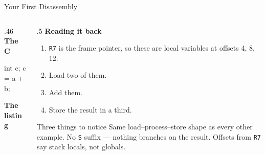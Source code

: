 \documentclass[9pt,aspectratio=169,xcolor=table]{beamer}
\begin{document}
\begin{frame}[fragile]{Your First Disassembly}
    \begin{columns}[T]
    \begin{column}{.46\textwidth}
        \textbf{The C}

        \vspace{1mm}
        \begin{cc}
	int c;
	c = a + b;
\end{cc}

        \vspace{3mm}
        \textbf{The listing}

        \vspace{1mm}
    \end{column}
    \begin{column}{.5\textwidth}
        \textbf{Reading it back}

        \vspace{1mm}
        {\small
        \begin{enumerate}\itemsep1pt
            \item \texttt{R7} is the \alert{frame pointer}, so these are
                  \alert{local variables} at offsets 4, 8, 12.
            \item Load two of them.
            \item Add them.
            \item Store the result in a third.
        \end{enumerate}}

        \vspace{3mm}
        \begin{block}{Three things to notice}
            {\small Same \alert{load--process--store} shape as every other
            example. No \texttt{S} suffix --- nothing branches on the
            result. Offsets from \texttt{R7} say \alert{stack locals}, not
            globals.}
        \end{block}
    \end{column}
    \end{columns}
\end{frame}
\end{document}
